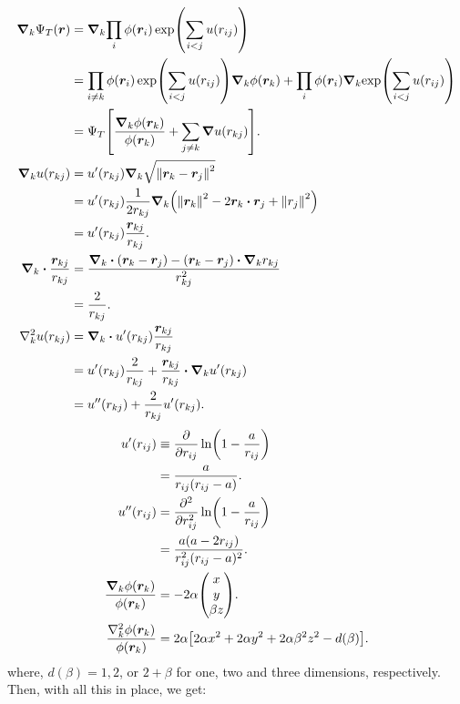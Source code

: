 \documentclass[]{article}
\begin{document}
\begin{align*}
    \grad_k{\Psi_T(\vec r)}  
    &= \grad_k{\prod_i \phi(\vec r_i)\exp(\sum_{i<j}u(r_{ij}))}\\
    &= \prod_{i\neq k} \phi(\vec r_i)\exp(\sum_{i<j}u(r_{ij}))\grad_k{\phi(\vec
    r_k)} + \prod_{i} \phi(\vec r_i)\grad_k{\exp(\sum_{i<j}u(r_{ij}))}\\
    &= \Psi_T\qty[\frac{\grad_k \phi(\vec r_k)}{\phi(\vec r_k)} + \sum_{j\neq k}
    \grad u(r_{kj})].\\
    \grad_k u(r_{kj}) &= u'(r_{kj})\grad_k \sqrt{\norm{\vec r_k - \vec r_j}^2}
    \\
    &= u'(r_{kj})\frac{1}{2r_{kj}}\grad_k\qty(\norm{\vec r_k}^2-2\vec r_k\vdot\vec
    r_j+\norm{r_j}^2)\\
    &= u'(r_{kj})\frac{\vec r_{kj}}{r_{kj}}.\\
    \grad_k\vdot\frac{\vec r_{kj}}{r_{kj}} &= \frac{\grad_k\vdot\qty(\vec r_k - \vec
    r_j) - \qty(\vec r_k-\vec r_j)\vdot\grad_k r_{kj}}{r_{kj}^2}\\
    &= \frac{2}{r_{kj}}.\\
    \laplacian_k u(r_{kj}) &= \grad_k\vdot u'(r_{kj})\frac{\vec
    r_{kj}}{r_{kj}} \\
    &= u'(r_{kj})\frac{2}{r_{kj}} + \frac{\vec r_{kj}}{r_{kj}}\vdot \grad_k
    u'(r_{kj})\\
    &= u''(r_{kj}) + \frac{2}{r_{kj}}u'(r_{kj}).
\end{align*}
\begin{align*}
    u'(r_{ij}) &\equiv \pdv{}{r_{ij}}\ln(1-\frac{a}{r_{ij}})\\
    &= \frac{a}{r_{ij}(r_{ij}-a)}.\\
    u''(r_{ij}) &= \pdv[2]{}{r_{ij}} \ln(1-\frac{a}{r_{ij}})\\
    &= \frac{a(a-2r_{ij})}{r_{ij}^2(r_{ij}-a)^2}.\\
    \frac{\grad_k \phi(\vec r_k)}{\phi(\vec r_k)} &= 
    - 2\alpha\mqty(x\\y\\\beta z).\\
    \frac{\laplacian_k \phi(\vec r_k)}{\phi(\vec r_k)} &=
    2\alpha\qty[2\alpha x^2 + 2\alpha y^2 + 2\alpha\beta^2z^2 - d(\beta)].
\end{align*}
where, $d(\beta) = 1, 2$, or $2 + \beta$ for one, two and three dimensions,
respectively.
Then, with all this in place, we get:
\end{document}
